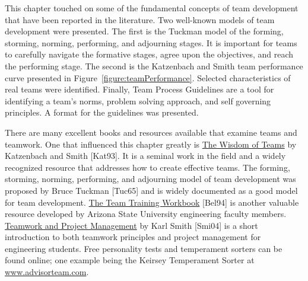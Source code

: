 This chapter touched on some of the fundamental concepts of team
development that have been reported in the literature. Two well-known
models of team development were presented. The first is the Tuckman
model of the forming, storming, norming, performing, and adjourning
stages. It is important for teams to carefully navigate the formative
stages, agree upon the objectives, and reach the performing stage. The
second is the Katzenbach and Smith team performance curve presented in
Figure~\ref{figure:teamPerformance}. Selected characteristics of real 
teams were identified.
Finally, Team Process Guidelines are a tool for identifying a team's
norms, problem solving approach, and self governing principles. A format
for the guidelines was presented.

There are many excellent books and resources available that examine
teams and teamwork. One that influenced this chapter greatly is \ul{The
Wisdom of Teams} by Katzenbach and Smith {[}Kat93{]}. It is a seminal
work in the field and a widely recognized resource that addresses how to
create effective teams. The forming, storming, norming, performing, and
adjourning model of team development was proposed by Bruce Tuckman
{[}Tuc65{]} and is widely documented as a good model for team
development. \ul{The Team Training Workbook} {[}Bel94{]} is another
valuable resource developed by Arizona State University engineering
faculty members. \ul{Teamwork and Project Management} by Karl Smith
{[}Smi04{]} is a short introduction to both teamwork principles and
project management for engineering students. Free personality tests and
temperament sorters can be found online; one example being the Keirsey
Temperament Sorter at
\href{http://www.advisorteam.com/}{www.advisorteam.com}.

